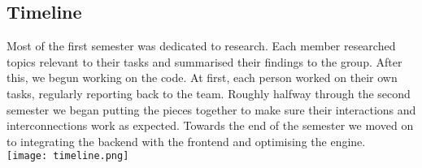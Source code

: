 \subsection{Timeline}
Most of the first semester was dedicated to research. Each member researched topics relevant to their tasks and summarised their findings to the group. After this, we begun working on the code. At first, each person worked on their own tasks, regularly reporting back to the team. Roughly halfway through the second semester we began putting the pieces together to make sure their interactions and interconnections work as expected. 
Towards the end of the semester we moved on to integrating the backend with the frontend and optimising the engine.\\
\texttt{[image: timeline.png]}\\
